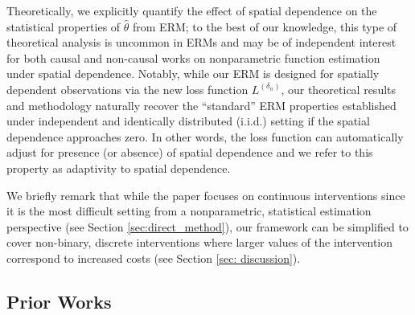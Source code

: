 \documentclass[12pt]{article}
\newcommand{\CP}[1]{{\color{purple}From Chan: #1}}
\newcommand{\XL}[1]{{\color{blue}from Xindi: #1}}
\begin{document}
Theoretically, %
we explicitly quantify the effect of spatial dependence on the statistical properties of $\hat{\theta}$ from ERM; to the best of our knowledge, this type of theoretical analysis is uncommon in ERMs and may be of independent interest for both causal and non-causal works on nonparametric function estimation under spatial dependence. Notably, while our ERM is designed for spatially dependent observations via the new loss function $L^{(\delta_n)}$, our theoretical results and methodology naturally recover the ``standard'' ERM properties established under independent and identically distributed (i.i.d.) setting if the spatial dependence approaches zero. In other words, the loss function can automatically adjust for presence (or absence) of spatial dependence and we refer to this property as adaptivity to spatial dependence.

We briefly remark that while the paper focuses on continuous interventions since it is the most difficult setting from a nonparametric, statistical estimation perspective (see Section \ref{sec:direct_method}), our framework can be simplified to cover non-binary, discrete interventions where larger values of the intervention correspond to increased costs (see Section \ref{sec: discussion}). 

\subsection{Prior Works} \label{sec:prior_works}

\end{document}
